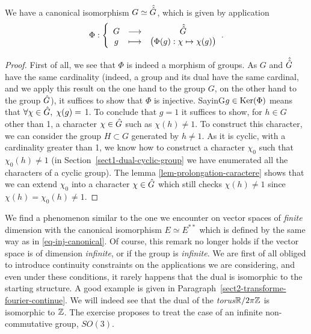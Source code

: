 \begin{prop}
   We have a canonical isomorphism $ G \simeq \hat{\hat{G}}$, which is given by application
\begin{equation}
\label{eq-inj-canonical}
\Phi: {\left\{ \begin{array}{ccc} G & \longrightarrow & \hat{\hat{G}} \\ g & \longmapsto & \big(\Phi(g): \chi \mapsto \chi(g) \big) \end{array} \right.}.
\end{equation}

\end{prop}
\begin{proof}
First of all, we see that $\Phi $ is indeed a morphism of groups. As $G$ and $\hat{\hat{G}}$ have the same cardinality (indeed, a group and its dual have the same cardinal, and we apply this result on the one hand to the group $G$, on the other hand to the group $\hat{G}$), it suffices to show that $\Phi $ is injective. SayinG$ g \in \operatorname{Ker}(\Phi)$ means that $\forall \chi \in \hat{G}, \; \chi(g) = $ 1. To conclude that $ g = 1$ it suffices to show, for $ h \in G$ other than 1, a character $\chi \in \hat{G}$ such as $\chi(h) \neq 1$. To construct this character, we can consider the group $ H \subset G$ generated by $ h \neq 1$. As it is cyclic, with a cardinality greater than 1, we know how to construct a character $\chi_0 $ such that $\chi_0(h) \neq 1$ (in Section~\ref{sect1-dual-cyclic-group} we have enumerated all the characters of a cyclic group). The lemma \ref{lem-prolongation-caractere} shows that we can extend $\chi_0 $ into a character $\chi \in \hat{G}$ which still checks $\chi(h) \neq 1$ since $\chi(h) = \chi_0(h) \neq 1$.
\end{proof}


\begin{rem}
 We find a phenomenon similar to the one we encounter on vector spaces of \textit{finite} dimension with the canonical isomorphism $ E \simeq E^{**}$ which is defined by the same way as in \eqref{eq-inj-canonical}. Of course, this remark no longer holds if the vector space is of dimension \textit{infinite}, or if the group is \textit{infinite}. We are first of all obliged to introduce continuity constraints on the applications we are considering, and even under these conditions, it rarely happens that the dual is isomorphic to the starting structure. A good example is given in Paragraph~\ref{sect2-transforme-fourier-continue}. We will indeed see that the dual of the \textit{torus}$\mathbb{R} /{2 \pi \mathbb{Z}}$ is isomorphic to $\mathbb{Z}$. The exercise  proposes to treat the case of an infinite non-commutative group, $ SO(3)$.
\end{rem}

